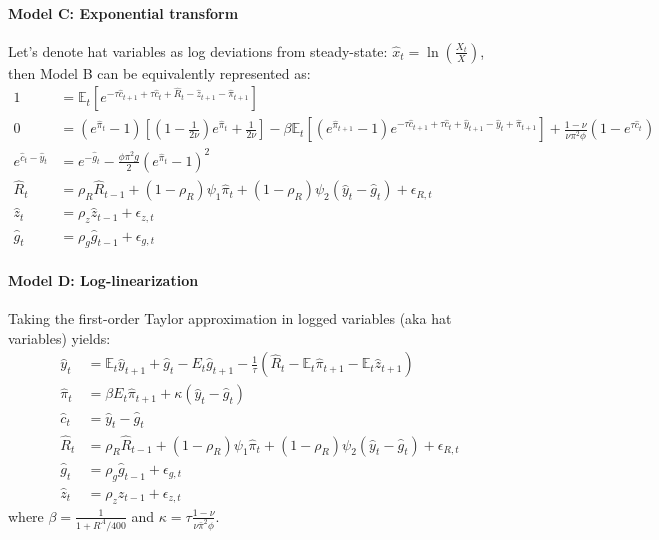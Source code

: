 \paragraph{Model C: Exponential transform}
Let's denote hat variables as log deviations from steady-state: $\hat{x}_t = \ln\left(\frac{X_t}{X}\right)$, then Model B can be equivalently represented as:
\begin{align}
1 &= \mathbb{E}_t \left[e^{-\tau \hat{c}_{t+1} + \tau \hat{c}_{t} + \hat{R}_{t} - \hat{z}_{t+1} - \hat{\pi}_{t+1} }\right]\label{eq:AS_C1}
\\
0 &= \left(e^{\hat{\pi}_{t}}-1\right) \left[\left(1-\frac{1}{2\nu}\right)e^{\hat{\pi}_{t}} + \frac{1}{2\nu}\right] - \beta \mathbb{E}_t \left[\left(e^{\hat{\pi}_{t+1}}-1 \right) e^{-\tau \hat{c}_{t+1} + \tau \hat{c}_{t} + \hat{y}_{t+1} - \hat{y}_{t} + \hat{\pi}_{t+1}}\right] + \frac{1-\nu}{\nu\pi^2\phi}\left(1-e^{\tau\hat{c}_{t}}\right)
\\
e^{\hat{c}_{t}-\hat{y}_{t}} &= e^{-\hat{g}_{t}} - \frac{\phi \pi^2 g}{2} \left(e^{\hat{\pi}_{t}}-1\right)^2\label{eq:AS_C3}
\\
\hat{R}_{t} &= \rho_R \hat{R}_{t-1} + (1-\rho_R) \psi_1 \hat{\pi}_{t} + (1-\rho_R)\psi_2(\hat{y}_{t}-\hat{g}_{t}) + \epsilon_{R,t}
\\
\hat{z}_{t} &= \rho_z \hat{z}_{t-1} + \epsilon_{z,t}
\\
\hat{g}_{t} &= \rho_g \hat{g}_{t-1} + \epsilon_{g,t}
\end{align}

\paragraph{Model D: Log-linearization}
Taking the first-order Taylor approximation in logged variables (aka hat variables) yields:
\begin{align}
\hat{y}_{t} &= \mathbb{E}_t \hat{y}_{t+1} + \hat{g}_{t} - E_t\hat{g}_{t+1} - \frac{1}{\tau} \left(\hat{R}_{t}- \mathbb{E}_t \hat{\pi}_{t+1} - \mathbb{E}_t \hat{z}_{t+1}\right) \label{eq:AS_D1}
\\
\hat{\pi}_{t} &= \beta E_t\hat{\pi}_{t+1} + \kappa \left(\hat{y}_{t} - \hat{g}_{t}\right)
\\
\hat{c}_{t} &= \hat{y}_{t} - \hat{g}_{t}
\\
\hat{R}_{t} &= \rho_R \hat{R}_{t-1} + (1-\rho_R) \psi_1 \hat{\pi}_{t} + (1-\rho_R)\psi_2(\hat{y}_{t}-\hat{g}_{t}) + \epsilon_{R,t}
\\
\hat{g}_{t} &= \rho_g \hat{g}_{t-1} + \epsilon_{g,t}
\\
\hat{z}_{t} &= \rho_z \hat{z}_{t-1} + \epsilon_{z,t}
\end{align}
where $\beta = \frac{1}{1+R^{A}/400}$ and $\kappa=\tau\frac{1-\nu}{\nu\bar{\pi}^2\phi}$.

